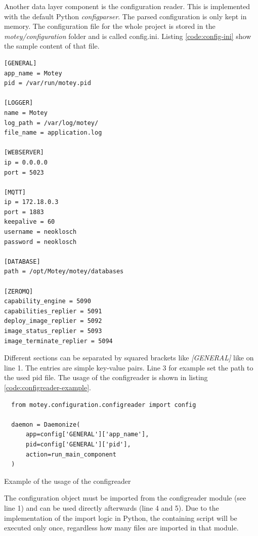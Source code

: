 Another data layer component is the configuration reader.
This is implemented with the default Python \textit{configparser}.
The parsed configuration is only kept in memory.
The configuration file for the whole project is stored in the \textit{motey/configuration} folder and is called config.ini.
Listing \ref{code:config-ini} show the sample content of that file.
\begin{verbatim}
[GENERAL]
app_name = Motey
pid = /var/run/motey.pid

[LOGGER]
name = Motey
log_path = /var/log/motey/
file_name = application.log

[WEBSERVER]
ip = 0.0.0.0
port = 5023

[MQTT]
ip = 172.18.0.3
port = 1883
keepalive = 60
username = neoklosch
password = neoklosch

[DATABASE]
path = /opt/Motey/motey/databases

[ZEROMQ]
capability_engine = 5090
capabilities_replier = 5091
deploy_image_replier = 5092
image_status_replier = 5093
image_terminate_replier = 5094
\end{verbatim}
\vspace{0.5cm}
Different sections can be separated by squared brackets like \textit{[GENERAL]} like on line 1.
The entries are simple key-value pairs.
Line 3 for example set the path to the used pid file.
The usage of the configreader is shown in listing \ref{code:configreader-example}.

\begin{listing}[H]
  \begin{verbatim}
  from motey.configuration.configreader import config

  daemon = Daemonize(
      app=config['GENERAL']['app_name'],
      pid=config['GENERAL']['pid'],
      action=run_main_component
  )
  \end{verbatim}
  \caption{Example of the usage of the configreader}
  \label{code:configreader-example}
\end{listing}
The configuration object must be imported from the configreader module (see line 1) and can be used directly afterwards (line 4 and 5).
Due to the implementation of the import logic in Python, the containing script will be executed only once, regardless how many files are imported in that module.

